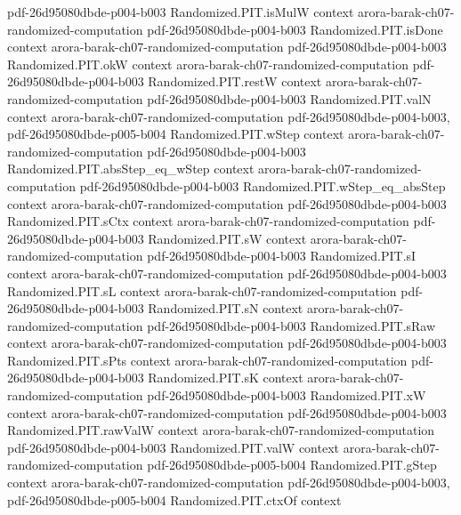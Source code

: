 \begin{theorem}
  {pdf-26d95080dbde-p004-b003}
\proofstep
  {Randomized.PIT.isMulW}
  {context}
  {arora-barak-ch07-randomized-computation}
  {pdf-26d95080dbde-p004-b003}
\proofstep
  {Randomized.PIT.isDone}
  {context}
  {arora-barak-ch07-randomized-computation}
  {pdf-26d95080dbde-p004-b003}
\proofstep
  {Randomized.PIT.okW}
  {context}
  {arora-barak-ch07-randomized-computation}
  {pdf-26d95080dbde-p004-b003}
\proofstep
  {Randomized.PIT.restW}
  {context}
  {arora-barak-ch07-randomized-computation}
  {pdf-26d95080dbde-p004-b003}
\proofstep
  {Randomized.PIT.valN}
  {context}
  {arora-barak-ch07-randomized-computation}
  {pdf-26d95080dbde-p004-b003,
    pdf-26d95080dbde-p005-b004}
\proofstep
  {Randomized.PIT.wStep}
  {context}
  {arora-barak-ch07-randomized-computation}
  {pdf-26d95080dbde-p004-b003}
\proofstep
  {Randomized.PIT.absStep_eq_wStep}
  {context}
  {arora-barak-ch07-randomized-computation}
  {pdf-26d95080dbde-p004-b003}
\proofstep
  {Randomized.PIT.wStep_eq_absStep}
  {context}
  {arora-barak-ch07-randomized-computation}
  {pdf-26d95080dbde-p004-b003}
\proofstep
  {Randomized.PIT.sCtx}
  {context}
  {arora-barak-ch07-randomized-computation}
  {pdf-26d95080dbde-p004-b003}
\proofstep
  {Randomized.PIT.sW}
  {context}
  {arora-barak-ch07-randomized-computation}
  {pdf-26d95080dbde-p004-b003}
\proofstep
  {Randomized.PIT.sI}
  {context}
  {arora-barak-ch07-randomized-computation}
  {pdf-26d95080dbde-p004-b003}
\proofstep
  {Randomized.PIT.sL}
  {context}
  {arora-barak-ch07-randomized-computation}
  {pdf-26d95080dbde-p004-b003}
\proofstep
  {Randomized.PIT.sN}
  {context}
  {arora-barak-ch07-randomized-computation}
  {pdf-26d95080dbde-p004-b003}
\proofstep
  {Randomized.PIT.sRaw}
  {context}
  {arora-barak-ch07-randomized-computation}
  {pdf-26d95080dbde-p004-b003}
\proofstep
  {Randomized.PIT.sPts}
  {context}
  {arora-barak-ch07-randomized-computation}
  {pdf-26d95080dbde-p004-b003}
\proofstep
  {Randomized.PIT.sK}
  {context}
  {arora-barak-ch07-randomized-computation}
  {pdf-26d95080dbde-p004-b003}
\proofstep
  {Randomized.PIT.xW}
  {context}
  {arora-barak-ch07-randomized-computation}
  {pdf-26d95080dbde-p004-b003}
\proofstep
  {Randomized.PIT.rawValW}
  {context}
  {arora-barak-ch07-randomized-computation}
  {pdf-26d95080dbde-p004-b003}
\proofstep
  {Randomized.PIT.valW}
  {context}
  {arora-barak-ch07-randomized-computation}
  {pdf-26d95080dbde-p005-b004}
\proofstep
  {Randomized.PIT.gStep}
  {context}
  {arora-barak-ch07-randomized-computation}
  {pdf-26d95080dbde-p004-b003,
    pdf-26d95080dbde-p005-b004}
\proofstep
  {Randomized.PIT.ctxOf}
  {context}

\end{theorem}
